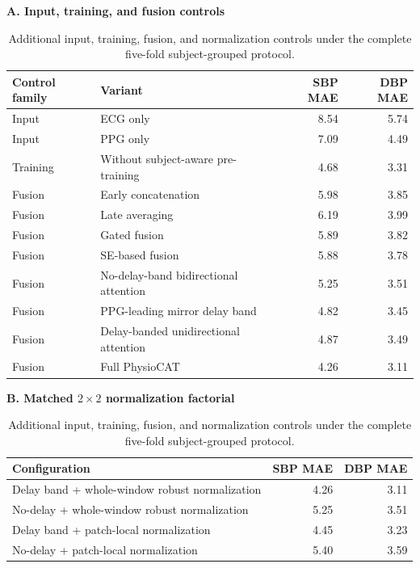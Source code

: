 \documentclass[11pt]{article}
\begin{document}
\begin{table}[H]
\centering
\caption{Additional input, training, fusion, and normalization controls under the complete five-fold subject-grouped protocol.}
\label{tab:additional_controls}
\label{tab:normalization_factorial}
\scriptsize
\textbf{A. Input, training, and fusion controls}\\[0.25em]
\begin{tabular}{llrr}
\toprule
Control family & Variant & SBP MAE & DBP MAE \\
\midrule
Input & ECG only & 8.54 & 5.74 \\
Input & PPG only & 7.09 & 4.49 \\
Training & Without subject-aware pre-training & 4.68 & 3.31 \\
Fusion & Early concatenation & 5.98 & 3.85 \\
Fusion & Late averaging & 6.19 & 3.99 \\
Fusion & Gated fusion & 5.89 & 3.82 \\
Fusion & SE-based fusion & 5.88 & 3.78 \\
Fusion & No-delay-band bidirectional attention & 5.25 & 3.51 \\
Fusion & PPG-leading mirror delay band & 4.82 & 3.45 \\
Fusion & Delay-banded unidirectional attention & 4.87 & 3.49 \\
Fusion & Full PhysioCAT & 4.26 & 3.11 \\
\bottomrule
\end{tabular}

\vspace{0.55em}
\textbf{B. Matched $2\times2$ normalization factorial}\\[0.25em]
\begin{tabular}{lrr}
\toprule
Configuration & SBP MAE & DBP MAE \\
\midrule
Delay band + whole-window robust normalization & 4.26 & 3.11 \\
No-delay + whole-window robust normalization & 5.25 & 3.51 \\
Delay band + patch-local normalization & 4.45 & 3.23 \\
No-delay + patch-local normalization & 5.40 & 3.59 \\
\bottomrule
\end{tabular}
\end{table}
\end{document}
